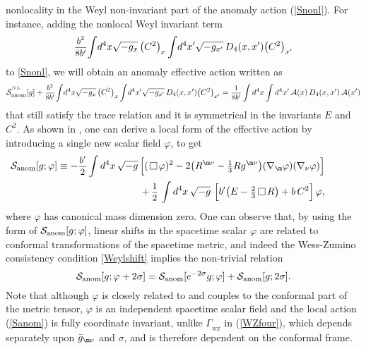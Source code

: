 \documentclass[a4paper,11pt,openright,twoside]{book}
\let\n=\nu      \let\x=\xi     \let\p=\pi      \let\r=\rho
\let\s=\sigma  \let\t=\tau     \let\u=\upsilon \let\f=\phi
\let\G=\Gamma  \let\D=\Delta \let\Q=\Theta  \let\L=\Lambda
\newcommand{\sdfrac}[2]{\mbox{\small$\displaystyle\frac{#1}{#2}$}}
\def\nbox#1#2{\vcenter{\hrule \hbox{\vrule height#2in
			\kern#1in \vrule} \hrule}}
\def\sq{\,\raise.5pt\hbox{$\nbox{.09}{.09}$}\,}
\numberwithin{equation}{section}
\begin{document}
{{{nonlocality in the Weyl non-invariant part of the anomaly action (\ref{Snonl}).
For instance, adding the nonlocal Weyl invariant term 
\begin{equation}
	\sdfrac {b^2}{8b'}\!\int \!d^4x\sqrt{-g_x}\, \big(C^2\big)_{x} \int\! d^4x'\sqrt{-g_{x'}}\,D_4(x,x') \big(C^2\big)_{x'}
	\label{SaddW}
\end{equation}
to \eqref{Snonl}, we will obtain an anomaly effective action written as
\begin{equation}
	\mathcal{S}_{\rm anom}^{^{NL}}[g]+\sdfrac {b^2}{8b'}\!\int \!d^4x\sqrt{-g_x}\, \big(C^2\big)_{x} \int\! d^4x'\sqrt{-g_{x'}}\,D_4(x,x') \big(C^2\big)_{x'}= \sdfrac {1}{8b'}\int d^4x \int d^4x'\, \mathcal{A}(x)\, D_4(x,x')\, \mathcal{A}(x')
	\label{Snonlsq}
\end{equation}
that still satisfy the trace relation and it is symmetrical in the invariants $E$ and $C^2$. 
As shown in \cite{Mottola:2006ew,Shapiro:1994ww}, one can derive a local form of the effective action by introducing a single new scalar field $\varphi$, to get
\begin{align}
	&&\hspace{-1.5cm} \mathcal{S}_{\rm anom}[g;\varphi] \equiv -\sdfrac{b'}{2} \int d^4x\,\sqrt{-g}\, \Big[ (\sq \varphi)^2 - 2 \big(R^{\m\n} - \tfrac{1}{3} R g^{\m\n}\big)
	(\nabla_\m\varphi)(\nabla_\n \varphi)\Big]\notag\\
	&& \hspace{1.5cm} +\, \sdfrac{1}{2}\,\int d^4x\,\sqrt{-g}\  \Big[b'\big(E - \tfrac{2}{3}\sq R\big) + b\,C^2 \Big]\,\varphi,
	\label{Sanom}
\end{align}
where $\varphi$ has canonical mass dimension zero. One can observe that, by using the form of $\mathcal{S}_{\rm anom}[g; \varphi]$, linear shifts in the spacetime scalar $\varphi$ are related to conformal transformations of the spacetime metric, and indeed
the Wess-Zumino consistency condition \eqref{Weylshift} implies the non-trivial relation
\begin{equation}
	\mathcal{S}_{\rm anom}[g; \varphi + 2 \s] = \mathcal{S}_{\rm anom}[e^{-2 \s} g; \varphi] + \mathcal{S}_{\rm anom}[g; 2 \s] .
	\label{SanomWZ}
\end{equation}
Note that although 
$\varphi$ is closely related to and couples to the conformal part of the metric tensor, $\varphi$ is an independent spacetime
scalar field and the local action (\ref{Sanom}) is fully coordinate invariant, unlike $\G_{_{\!W\!Z}}$ in (\ref{WZfour}), which 
depends separately upon $\bar g_{\m\n}$ and $\s$, and is therefore dependent on the conformal frame.
}}}
\end{document}
